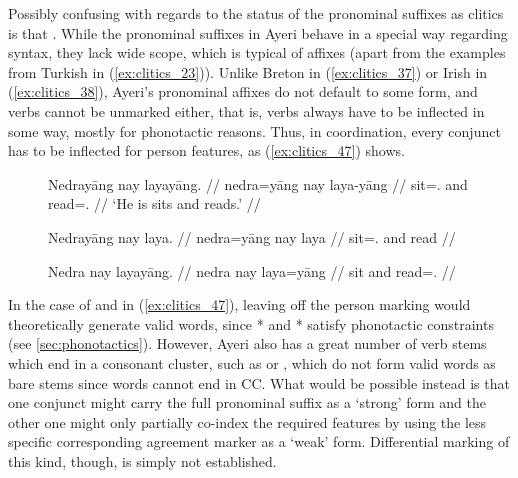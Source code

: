 Possibly confusing with regards to the status of the pronominal suffixes as
cli\-tics is that .
While the pronominal suffixes in Ayeri behave in a special way regarding
syntax, they lack wide scope, which is typical of affixes (apart from the
examples from Turkish in (\ref{ex:clitics_23})). Unlike Breton in
(\ref{ex:clitics_37}) or Irish in (\ref{ex:clitics_38}), Ayeri's pronominal
affixes do not default to some form, and verbs cannot be unmarked either, that
is, verbs always have to be inflected in some way, mostly for phonotactic
reasons. Thus, in coordination, every conjunct has to be inflected for person
features, as (\ref{ex:clitics_47}) shows.

\begin{figure}
\pex\label{ex:clitics_47}
\a\label{ex:clitics_47a}\begingl
	\gla Nedrayāng nay layayāng. //
	\glb nedra=yāng nay laya-yāng //
	\glc sit=\TsgM{}.\Aarg{} and read=\TsgM{}.\Aarg{} //
	\glft `He is sits and reads.' //
\endgl

\a\label{ex:clitics_47b}\ljudge{*}\begingl
	\gla Nedrayāng nay laya. //
	\glb nedra=yāng nay laya //
	\glc sit=\TsgM{}.\Aarg{} and read //
\endgl

\a\label{ex:clitics_47c}\ljudge{*}\begingl
	\gla Nedra nay layayāng. //
	\glb nedra nay laya=yāng //
	\glc sit and read=\TsgM{}.\Aarg{} //
\endgl
\xe
\end{figure}

In the case of  and  in
(\ref{ex:clitics_47}), leaving off the person marking would theoretically
generate valid words, since * and * satisfy
phonotactic constraints (see \autoref{sec:phonotactics}). However, Ayeri also
has a great number of verb stems which end in a consonant cluster, such as
 or , which do not form valid
words as bare stems since words cannot end in CC. What would be possible
instead is that one conjunct might carry the full pronominal suffix as a
`strong' form and the other one might only partially co-index the required
features by using the less specific corresponding agreement marker as a `weak'
form. Differential marking of this kind, though, is simply not established.


